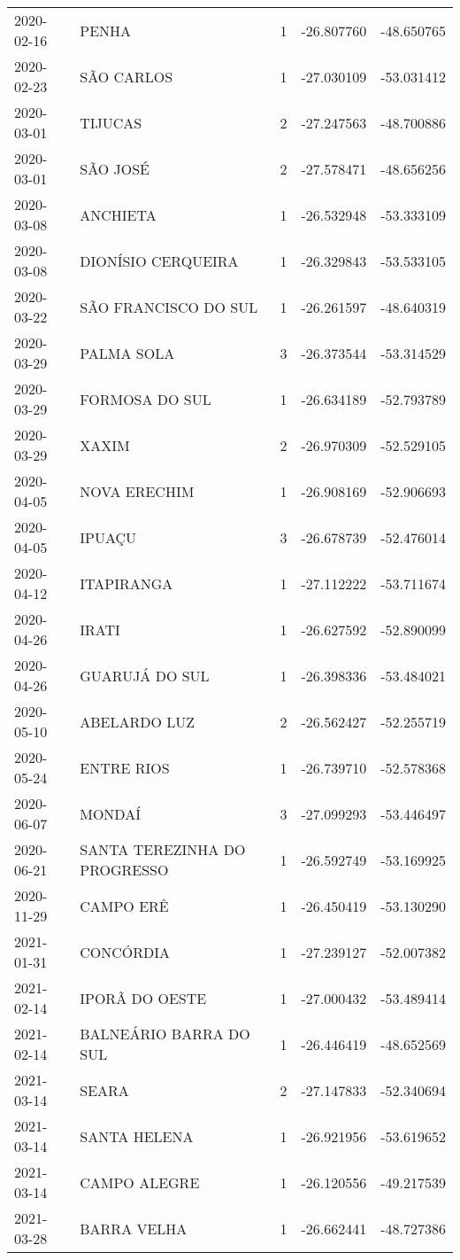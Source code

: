 \documentclass[
	12pt,				%
	openright,			%
	oneside,			%
	a4paper,			%
	english,			%
	french,				%
	spanish,			%
	brazil				%
	dvipsnames, table]{abntex2}
\begin{document}
\begin{longtable}[htbp]{llcrr}
2020-02-16 & PENHA & 1 & -26.807760 & -48.650765 \\
2020-02-23 & SÃO CARLOS & 1 & -27.030109 & -53.031412 \\
2020-03-01 & TIJUCAS & 2 & -27.247563 & -48.700886 \\
2020-03-01 & SÃO JOSÉ & 2 & -27.578471 & -48.656256 \\
2020-03-08 & ANCHIETA & 1 & -26.532948 & -53.333109 \\
2020-03-08 & DIONÍSIO CERQUEIRA & 1 & -26.329843 & -53.533105 \\
2020-03-22 & SÃO FRANCISCO DO SUL & 1 & -26.261597 & -48.640319 \\
2020-03-29 & PALMA SOLA & 3 & -26.373544 & -53.314529 \\
2020-03-29 & FORMOSA DO SUL & 1 & -26.634189 & -52.793789 \\
2020-03-29 & XAXIM & 2 & -26.970309 & -52.529105 \\
2020-04-05 & NOVA ERECHIM & 1 & -26.908169 & -52.906693 \\
2020-04-05 & IPUAÇU & 3 & -26.678739 & -52.476014 \\
2020-04-12 & ITAPIRANGA & 1 & -27.112222 & -53.711674 \\
2020-04-26 & IRATI & 1 & -26.627592 & -52.890099 \\
2020-04-26 & GUARUJÁ DO SUL & 1 & -26.398336 & -53.484021 \\
2020-05-10 & ABELARDO LUZ & 2 & -26.562427 & -52.255719 \\
2020-05-24 & ENTRE RIOS & 1 & -26.739710 & -52.578368 \\
2020-06-07 & MONDAÍ & 3 & -27.099293 & -53.446497 \\
2020-06-21 & SANTA TEREZINHA DO PROGRESSO & 1 & -26.592749 & -53.169925 \\
2020-11-29 & CAMPO ERÊ & 1 & -26.450419 & -53.130290 \\
2021-01-31 & CONCÓRDIA & 1 & -27.239127 & -52.007382 \\
2021-02-14 & IPORÃ DO OESTE & 1 & -27.000432 & -53.489414 \\
2021-02-14 & BALNEÁRIO BARRA DO SUL & 1 & -26.446419 & -48.652569 \\
2021-03-14 & SEARA & 2 & -27.147833 & -52.340694 \\
2021-03-14 & SANTA HELENA & 1 & -26.921956 & -53.619652 \\
2021-03-14 & CAMPO ALEGRE & 1 & -26.120556 & -49.217539 \\
2021-03-28 & BARRA VELHA & 1 & -26.662441 & -48.727386 \\

\end{longtable}
\end{document}
